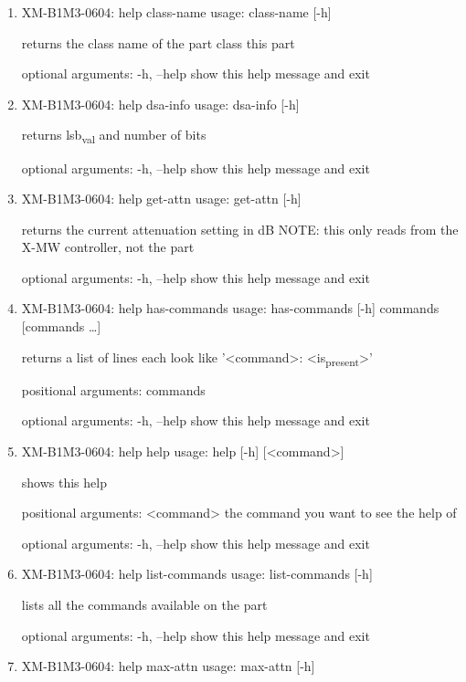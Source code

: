 \documentclass[11pt]{article}
\begin{document}
\begin{enumerate}
\item XM-B1M3-0604: help class-name
\label{sec:org8cf2cba}
usage: class-name [-h]

returns the class name of the part class this part

optional arguments:
  -h, --help  show this help message and exit

\item XM-B1M3-0604: help dsa-info
\label{sec:org064b845}
usage: dsa-info [-h]

returns lsb\textsubscript{val} and number of bits

optional arguments:
  -h, --help  show this help message and exit

\item XM-B1M3-0604: help get-attn
\label{sec:orgeddae3c}
usage: get-attn [-h]

returns the current attenuation setting in dB NOTE: this only reads from the
X-MW controller, not the part

optional arguments:
  -h, --help  show this help message and exit

\item XM-B1M3-0604: help has-commands
\label{sec:orgf43fc9a}
usage: has-commands [-h] commands [commands \ldots{}]

returns a list of lines each look like '<command>: <is\textsubscript{present}>'

positional arguments:
  commands

optional arguments:
  -h, --help  show this help message and exit

\item XM-B1M3-0604: help help
\label{sec:org56451b2}
usage: help [-h] [<command>]

shows this help

positional arguments:
  <command>   the command you want to see the help of

optional arguments:
  -h, --help  show this help message and exit

\item XM-B1M3-0604: help list-commands
\label{sec:org496f9fe}
usage: list-commands [-h]

lists all the commands available on the part

optional arguments:
  -h, --help  show this help message and exit

\item XM-B1M3-0604: help max-attn
\label{sec:org0876c42}
usage: max-attn [-h]


\end{enumerate}
\end{document}

